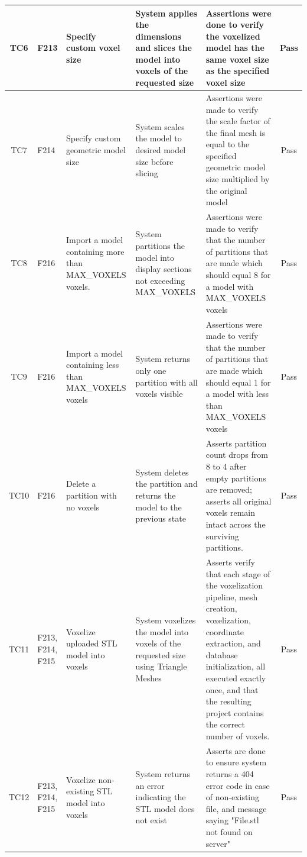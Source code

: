 \documentclass[12pt, titlepage]{article}
\begin{document}
\begin{longtable}{c
    >{\raggedright\arraybackslash}p{1.5cm}
    >{\raggedright\arraybackslash}p{3cm}
    >{\raggedright\arraybackslash}p{3cm}
  >{\raggedright\arraybackslash}p{5cm} c}
  TC6 & F213 & Specify custom voxel size & System applies the dimensions and slices the model into voxels of the requested size & Assertions were done to verify the voxelized model has the same voxel size as the specified voxel size  & \cellcolor{green} Pass \\ \midrule
  TC7 & F214 & Specify custom geometric model size & System scales the model to desired model size before slicing & Assertions were made to verify the scale factor of the final mesh is equal to the specified geometric model size multiplied by the original model& \cellcolor{green} Pass \\ \midrule
  TC8 & F216 & Import a model containing more than MAX\_VOXELS voxels. & System partitions the model into display sections not exceeding MAX\_VOXELS & Assertions were made to verify that the number of partitions that are made which should equal 8 for a model with MAX\_VOXELS voxels& \cellcolor{green} Pass \\ \midrule
  TC9 & F216 & Import a model containing less than MAX\_VOXELS voxels & System returns only one partition with all voxels visible & Assertions were made to verify that the number of partitions that are made which should equal 1 for a model with less than MAX\_VOXELS voxels & \cellcolor{green} Pass \\ \midrule
  TC10 & F216 & Delete a partition with no voxels & System deletes the partition and returns the model to the previous state & Asserts partition count drops from 8 to 4 after empty partitions are removed; asserts all original voxels remain intact across the surviving partitions. & \cellcolor{green} Pass \\ \midrule
  TC11 & F213, F214, F215 & Voxelize uploaded STL model into voxels& System voxelizes the model into voxels of the requested size using Triangle Meshes & Asserts verify that each stage of the voxelization pipeline, mesh creation, voxelization, coordinate extraction, and database initialization, all executed exactly once, and that the resulting project contains the correct number of voxels. & \cellcolor{green} Pass \\ \midrule
  TC12 & F213, F214, F215 & Voxelize non-existing STL model into voxels& System returns an error indicating the STL model does not exist & Asserts are done to ensure system returns a 404 error code in case of non-existing file, and message saying "File.stl not found on server" & \cellcolor{green} Pass \\
\end{longtable}
\end{document}
